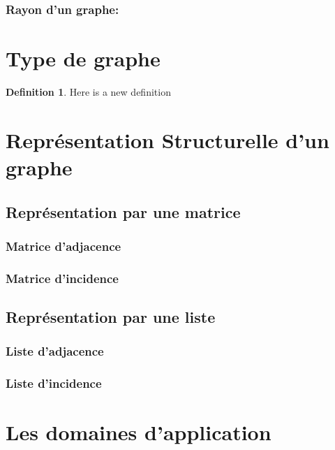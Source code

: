 \documentclass[11pt,a4paper]{report}
\theoremstyle{definition}
\newtheorem{defn}{Definition}[section]
\begin{document}
			\subsubsection{Rayon d'un graphe:}
			
	
	
	
	
	
	
			 
			
	\section{Type de graphe} %
		\begin{defn}
			Here is a new definition
		\end{defn}
	
	\section{Représentation Structurelle d'un graphe}
		\subsection{Représentation par une matrice}
			\subsubsection{Matrice d'adjacence}
			\subsubsection{Matrice d'incidence}
		\subsection{Représentation par une liste}
			\subsubsection{Liste d'adjacence}
			\subsubsection{Liste d'incidence}
			
			
	\section{Les domaines d'application}
	
\end{document}
